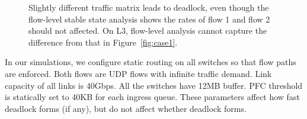 \begin{figure}[t]
\centering

\caption{Slightly different traffic matrix leads to deadlock, even though
the flow-level stable state analysis shows the rates of flow 1 and flow 2 should not affected.
On L3, flow-level analysis cannot capture the difference from that in Figure~\ref{fig:case1}.
}
\label{fig:case2}
\end{figure}

In our simulations, we configure static routing on all switches so that flow paths are enforced. 
Both flows are UDP flows with infinite traffic demand. Link capacity of 
all links is 40Gbps. All the switches have 12MB buffer. PFC threshold is statically set to 40KB for 
each ingress queue. These parameters affect how fast deadlock forms (if any), but do not affect whether deadlock forms.

